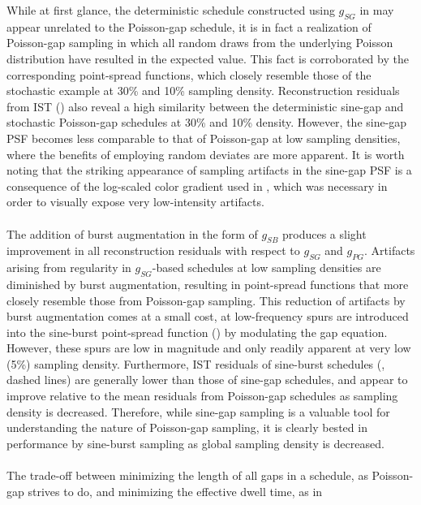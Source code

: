 \begin{doublespace}
While at first glance, the deterministic schedule constructed using $g_{SG}$
in  may appear unrelated to the Poisson-gap
schedule, it is in fact a realization of Poisson-gap sampling in which all
random draws from the underlying Poisson distribution have resulted in the
expected value. This fact is corroborated by the corresponding point-spread
functions, which closely resemble those of the stochastic example at 30\% and
10\% sampling density. Reconstruction residuals from IST
() also reveal a high
similarity between the deterministic sine-gap and stochastic Poisson-gap
schedules at 30\% and 10\% density. However, the sine-gap PSF becomes less
comparable to that of Poisson-gap at low sampling densities, where the
benefits of employing random deviates are more apparent. It is worth noting
that the striking appearance of sampling artifacts in the sine-gap PSF is a
consequence of the log-scaled color gradient used in ,
which was necessary in order to visually expose very low-intensity artifacts.
\\\\
The addition of burst augmentation in the form of $g_{SB}$ produces a slight
improvement in all reconstruction residuals with respect to $g_{SG}$ and
$g_{PG}$. Artifacts arising from regularity in $g_{SG}$-based schedules at
low sampling densities are diminished by burst augmentation, resulting in
point-spread functions that more closely resemble those from Poisson-gap
sampling. This reduction of artifacts by burst augmentation comes at a small
cost, at low-frequency spurs are introduced into the sine-burst point-spread
function () by modulating the gap equation.
However, these spurs are low in magnitude and only readily apparent at very
low (5\%) sampling density. Furthermore, IST residuals of sine-burst schedules
(, dashed lines) are generally lower than
those of sine-gap schedules, and appear to improve relative to the mean
residuals from Poisson-gap schedules as sampling density is decreased.
Therefore, while sine-gap sampling is a valuable tool for understanding
the nature of Poisson-gap sampling, it is clearly bested in performance
by sine-burst sampling as global sampling density is decreased.
\\\\
The trade-off between minimizing the length of all gaps in a schedule, as
Poisson-gap strives to do, and minimizing the effective dwell time, as in

\end{doublespace}

